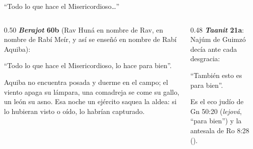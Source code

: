 \begin{frame}{``Todo lo que hace el Misericordioso\ldots''}
\begin{columns}[t,onlytextwidth]
\begin{column}{0.50\textwidth}\small
\textbf{\emph{Berajot} 60b} (Rav Huná en nombre de Rav, en nombre de Rabí Meír, y así se enseñó en nombre de Rabí Aquiba):
\begin{center}\end{center}
``Todo lo que hace el Misericordioso, lo hace para bien''.\par\smallskip
\scriptsize Aquiba no encuentra posada y duerme en el campo; el viento apaga su lámpara, una comadreja se come su gallo, un león su asno. Esa noche un ejército saquea la aldea: si lo hubieran visto o oído, lo habrían capturado.
\end{column}
\begin{column}{0.48\textwidth}\small
\textbf{\emph{Taanit} 21a}: Najúm de Guimzó decía ante cada desgracia:
\begin{center}\end{center}
``También esto es para bien''.\par\medskip
\begin{tcolorbox}[colback=papiro,colframe=azul,boxrule=1pt,arc=3pt]
\scriptsize Es el eco judío de Gn 50:20 (\emph{lejová}, ``para bien'') y la antesala de Ro 8:28 ().
\end{tcolorbox}
\end{column}
\end{columns}\par\smallskip
{}
\end{frame}

